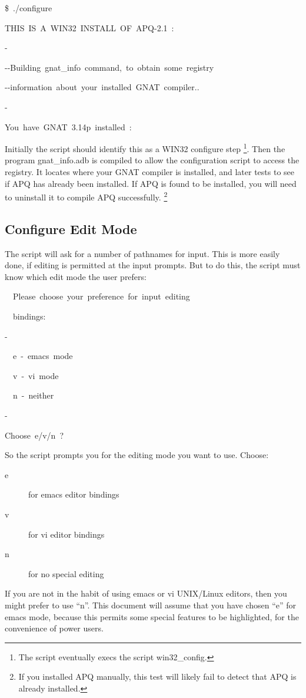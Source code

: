 \documentclass[english]{report}
\newenvironment{lyxcode}
   {\begin{list}{}{
     \setlength{\rightmargin}{\leftmargin}
     \setlength{\listparindent}{0pt}%
     \raggedright
     \setlength{\itemsep}{0pt}
     \setlength{\parsep}{0pt}
     \normalfont\ttfamily}%
    \item[]}
   {\end{list}}
\begin{document}
\begin{lyxcode}
\$~./configure



THIS~IS~A~WIN32~INSTALL~OF~APQ-2.1~:

-

-{}-Building~gnat\_info~command,~to~obtain~some~registry

-{}-information~about~your~installed~GNAT~compiler..

-

You~have~GNAT~3.14p~installed~:


\end{lyxcode}
Initially the script should identify this as a WIN32 configure step%
\footnote{The script eventually execs the script win32\_config.%
}. Then the program gnat\_info.adb is compiled to allow the configuration
script to access the registry. It locates where your GNAT compiler
is installed, and later tests to see if APQ has already been installed.
If APQ is found to be installed, you will need to uninstall it to
compile APQ successfully.%
\footnote{If you installed APQ manually, this test will likely fail to detect
that APQ is already installed.%
}


\subsection{Configure Edit Mode}

The script will ask for a number of pathnames for input. This is more
easily done, if editing is permitted at the input prompts. But to
do this, the script must know which edit mode the user prefers:

\begin{lyxcode}


~~Please~choose~your~preference~for~input~editing

~~bindings:

-

~~e~-~emacs~mode

~~v~-~vi~mode

~~n~-~neither

-

Choose~e/v/n~?
\end{lyxcode}
So the script prompts you for the editing mode you want to use. Choose:

\begin{description}
\item [e]for emacs editor bindings
\item [v]for vi editor bindings
\item [n]for no special editing
\end{description}
If you are not in the habit of using emacs or vi UNIX/Linux editors,
then you might prefer to use {}``n''. This document will assume
that you have chosen {}``e'' for emacs mode, because this permits
some special features to be highlighted, for the convenience of power
users.
\end{document}
